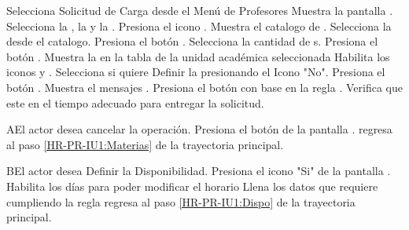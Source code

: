 \begin{UCtrayectoria}
	\UCpaso [\UCactor] Selecciona Solicitud de Carga desde el Menú de Profesores
	\UCpaso [\UCsist]  Muestra la pantalla . 
	\UCpaso [\UCactor] Selecciona la , la  y la .
	\UCpaso [\UCactor] Presiona el icono \IUBuscar. \label{HR-PR-IU1:Materias}
	\UCpaso [\UCsist]  Muestra el catalogo de . 
	\UCpaso [\UCactor] Selecciona la  desde el catalogo.
	\UCpaso [\UCactor] Presiona el botón . 
	\UCpaso [\UCactor] Selecciona la cantidad de s.
	\UCpaso [\UCactor] Presiona el botón .
	\UCpaso [\UCsist]  Muestra la  en la tabla de la unidad académica seleccionada
	\UCpaso [\UCsist]  Habilita los iconos \IURegistrar y \IUEliminar.
	\UCpaso [\UCactor] Selecciona si quiere Definir la  presionando el Icono "No".   \label{HR-PR-CU1:EdiEli}
	\UCpaso [\UCactor] Presiona el botón .   \label{HR-PR-IU1:Dispo}
	\UCpaso [\UCsist]  Muestra el mensajes .
	\UCpaso [\UCactor] Presiona el botón  con base en la regla . 
	\UCpaso [\UCsist]  Verifica que este en el tiempo adecuado para entregar la solicitud. 
\end{UCtrayectoria}

\begin{UCtrayectoriaA}{A}{El actor desea cancelar la operación.}
	\UCpaso [\UCactor] Presiona el botón  de la pantalla .
	\UCpaso regresa al paso \ref{HR-PR-IU1:Materias} de la trayectoria principal.
\end{UCtrayectoriaA} 

\begin{UCtrayectoriaA}{B}{El actor desea Definir la Disponibilidad.}
	\UCpaso [\UCactor] Presiona el icono "Si" de la pantalla .
	\UCpaso [\UCsist] Habilita los días para poder modificar el horario
	\UCpaso [\UCactor] Llena los datos que requiere cumpliendo la regla 
	\UCpaso regresa al paso \ref{HR-PR-IU1:Dispo} de la trayectoria principal.
\end{UCtrayectoriaA} 

